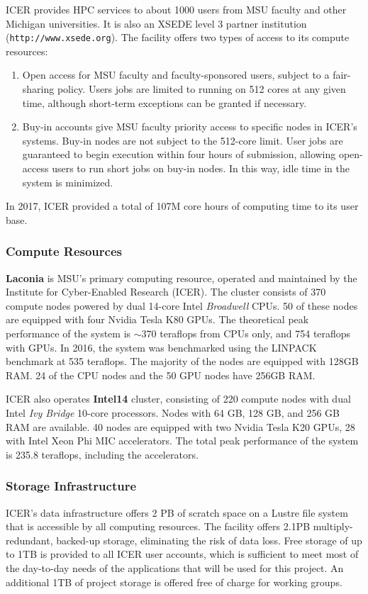 \documentclass[10pt]{article}
\begin{document}
ICER provides HPC services to about 1000 users from MSU faculty and other
Michigan universities. It is also an XSEDE level 3 partner institution
(\texttt{http://www.xsede.org}). The facility offers two types of access
to its compute resources:
\begin{enumerate}
\item Open access for MSU faculty and faculty-sponsored users, subject to
a fair-sharing policy. Users jobs are limited to running on 512 cores at
any given time, although short-term exceptions can be granted if necessary.
\item Buy-in accounts give MSU faculty priority access to specific nodes
in ICER's systems. Buy-in nodes are not subject to the 512-core limit.
User jobs are guaranteed to begin execution within four hours of submission,
allowing open-access users to run short jobs on buy-in nodes. In this way,
idle time in the system is minimized.
\end{enumerate}
In 2017, ICER provided a total of 107M core hours of computing time to its
user base.

\subsubsection{Compute Resources}
\textbf{Laconia} is MSU's primary computing resource, operated and maintained
by the Institute for Cyber-Enabled Research (ICER). The cluster consists
of 370 compute nodes powered by dual 14-core Intel \emph{Broadwell} CPUs.
50 of these nodes are equipped with four Nvidia Tesla K80 GPUs. The theoretical
peak performance of the system is  $\sim$370 teraflops from CPUs only, and
754 teraflops with GPUs. In 2016, the system was benchmarked using the LINPACK
benchmark at 535 teraflops. The majority of the nodes are equipped with 128GB
RAM. 24 of the CPU nodes and the 50 GPU nodes have 256GB RAM.

ICER also operates \textbf{Intel14} cluster, consisting of 220 compute nodes
with dual Intel \emph{Ivy Bridge} 10-core processors. Nodes with 64 GB, 128 GB,
and 256 GB RAM are available. 40 nodes are equipped with two Nvidia Tesla K20
GPUs, 28 with Intel Xeon Phi MIC accelerators. The total peak performance of
the system is 235.8 teraflops, including the accelerators.

\subsubsection{Storage Infrastructure}
ICER's data infrastructure offers 2 PB of scratch space on a Lustre
file system that is accessible by all computing resources. The facility offers
2.1PB multiply-redundant, backed-up storage, eliminating the risk of data loss.
Free storage of up to 1TB is provided to all ICER user accounts, which is
sufficient to meet most of the day-to-day needs of the applications that
will be used for this project. An additional 1TB of project storage
is offered free of charge for working groups.
\end{document}
